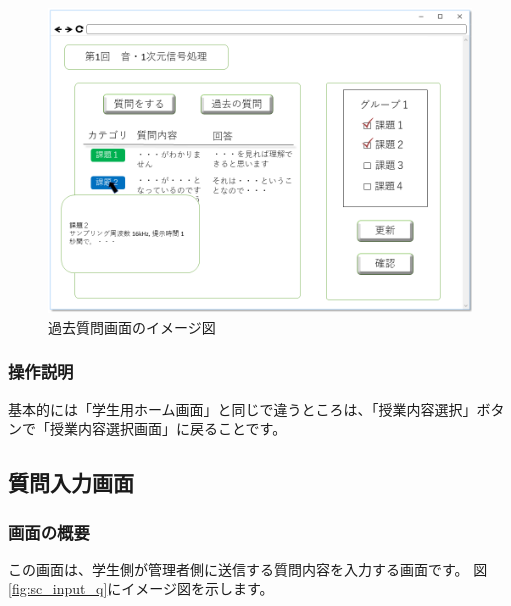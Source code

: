 \begin{figure}[htbp]
\begin{center}
  \includegraphics[width=1\linewidth,clip]{./img/sc_pre_q.png}
  \caption{過去質問画面のイメージ図}\label{fig:sc_pre_q}
\end{center}
\end{figure}

\subsubsection{操作説明}
基本的には「学生用ホーム画面」と同じで違うところは、「授業内容選択」ボタンで「授業内容選択画面」に戻ることです。

\subsection{質問入力画面}
\subsubsection{画面の概要}
この画面は、学生側が管理者側に送信する質問内容を入力する画面です。
図\ref{fig:sc_input_q}にイメージ図を示します。

